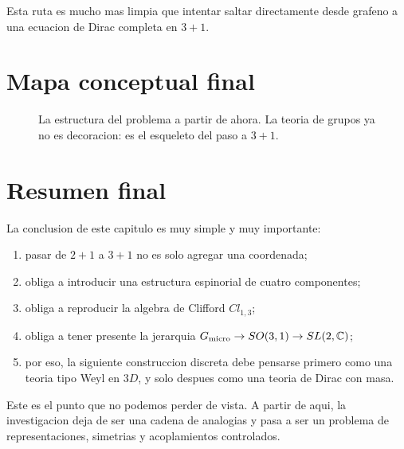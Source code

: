 Esta ruta es mucho mas limpia que intentar saltar directamente desde grafeno a una ecuacion de Dirac completa en \(3+1\).

\section{Mapa conceptual final}

\begin{figure}[ht]
\centering
{}
\caption{La estructura del problema a partir de ahora. La teoria de grupos ya no es decoracion: es el esqueleto del paso a \(3+1\).}
\label{c17:fig:final-map}
\end{figure}

\section{Resumen final}

La conclusion de este capitulo es muy simple y muy importante:

\begin{enumerate}[leftmargin=*]
  \item pasar de \(2+1\) a \(3+1\) no es solo agregar una coordenada;
  \item obliga a introducir una estructura espinorial de cuatro componentes;
  \item obliga a reproducir la algebra de Clifford \(Cl_{1,3}\);
  \item obliga a tener presente la jerarquia \(G_{\mathrm{micro}} \to SO(3,1) \to SL(2,\mathbb{C})\);
  \item por eso, la siguiente construccion discreta debe pensarse primero como una teoria tipo Weyl en \(3D\), y solo despues como una teoria de Dirac con masa.
\end{enumerate}

Este es el punto que no podemos perder de vista. A partir de aqui, la investigacion deja de ser una cadena de analogias y pasa a ser un problema de representaciones, simetrias y acoplamientos controlados.
